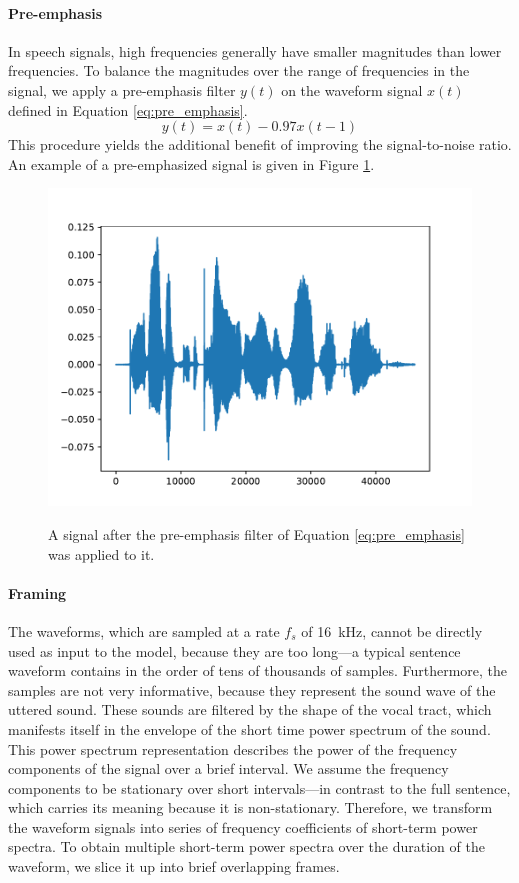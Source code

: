 		\paragraph{Pre-emphasis}

			In speech signals, high frequencies generally have smaller magnitudes than lower frequencies.
			To balance the magnitudes over the range of frequencies in the signal, we apply a pre-emphasis filter $y(t)$ on the waveform signal $x(t)$ defined in Equation \ref{eq:pre_emphasis}.
			\begin{equation}\label{eq:pre_emphasis}
				y(t) = x(t) - 0.97x(t-1)
			\end{equation}
			This procedure yields the additional benefit of improving the signal-to-noise ratio.
			An example of a pre-emphasized signal is given in Figure \ref{fig:signalemph}.
			\begin{figure}[ht]
				\centering
			    \includegraphics[width=.45\linewidth]{gfx/signalemph}
			    \label{fig:signalemph}
			    \caption[Pre-emphasis]{A signal after the pre-emphasis filter of Equation \ref{eq:pre_emphasis} was applied to it.}
			\end{figure}

		\paragraph{Framing}
			The waveforms, which are sampled at a rate $f_s$ of \SI{16}{\kHz}, cannot be directly used as input to the model, because they are too long---a typical sentence waveform contains in the order of tens of thousands of samples.
			Furthermore, the samples are not very informative, because they represent the sound wave of the uttered sound.
			These sounds are filtered by the shape of the vocal tract, which manifests itself in the envelope of the short time power spectrum of the sound.
			This power spectrum representation describes the power of the frequency components of the signal over a brief interval.
			We assume the frequency components to be stationary over short intervals---in contrast to the full sentence, which carries its meaning because it is non-stationary.
			Therefore, we transform the waveform signals into series of frequency coefficients of short-term power spectra.
			To obtain multiple short-term power spectra over the duration of the waveform, we slice it up into brief overlapping frames.


